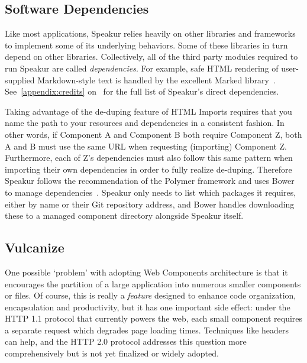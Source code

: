 \subsection{Software Dependencies}
\label{sec:dependencies}
Like most applications, Speakur relies heavily on other libraries and frameworks to implement some of its underlying behaviors. 
Some of these libraries in turn depend on other libraries.
Collectively, all of the third party modules required to run Speakur are called \textit{dependencies}.
For example, safe HTML rendering of user-supplied Markdown-style text is handled by the excellent Marked library~\cite{christopherjeffrey2014}.
See~\cref{appendix:credits} on~ for the full list of Speakur's direct dependencies.

Taking advantage of the de-duping feature of HTML Imports
requires that you name the path to your resources and dependencies in a consistent fashion.
In other words, if Component A and Component B both require Component Z, both A and B must use the same URL when requesting (importing) Component Z.
Furthermore, each of Z's dependencies must also follow this same pattern when importing their own dependencies in order to fully realize de-duping.
Therefore Speakur follows the recommendation of the Polymer framework and uses Bower to manage dependencies~\cite{bowercontributors2015}. 
Speakur only needs to list which packages it requires, either by name or their Git repository address, 
and Bower handles downloading these to a managed component directory alongside Speakur itself.

\subsection{Vulcanize}
One possible `problem' with adopting Web Components architecture is that it encourages the partition of a large application into numerous smaller components or files.
Of course, this is really a \textit{feature} designed to enhance code organization, encapsulation and productivity, 
but it has one important side effect: 
under the HTTP 1.1 protocol that currently powers the web, each small component requires a separate request which degrades page loading times.
Techniques like  headers can help, and the HTTP 2.0 protocol addresses this question more comprehensively but is not yet finalized or widely adopted.

